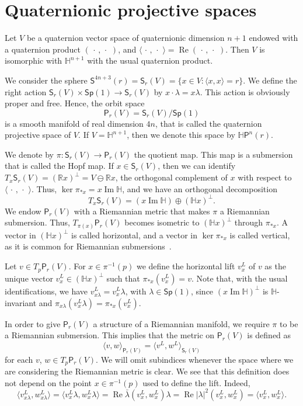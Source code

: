 \documentclass[12pt, a4paper]{amsart}
\newcommand{\R}{\mathbb{R}}
\renewcommand{\H}{\mathbb{H}}
\renewcommand{\Re}{\operatorname{Re}}
\renewcommand{\Im}{\operatorname{Im}}
\newcommand{\Sp}{\mathsf{Sp}}
\theoremstyle{remark}
\begin{document}
\section{Quaternionic projective spaces}

Let $V$ be a quaternion vector space of quaternionic dimension $n+1$ endowed with a quaternion product $(\,\cdot\,,\,\cdot\,\,)$, and $\langle\,\cdot\,,\,\cdot\,\,\rangle=\Re(\,\cdot\,,\,\cdot\,\,)$.
Then $V$ is isomorphic with $\H^{n+1}$ with the usual quaternion product.

We consider the sphere $\mathsf{S}^{4n+3}(r)=\mathsf{S}_r(V)=\{{x}\in V:\langle {x},{x}\rangle=r\}$.
We define the right action $\mathsf{S}_r(V)\times\Sp(1)\to\mathsf{S}_r(V)$ by ${x}\cdot \lambda={x}\lambda$.
This action is obviously proper and free. 
Hence, the orbit space 
\[
\mathsf{P}_r(V)=\mathsf{S}_r(V)/\Sp(1)
\]
is a smooth manifold of real dimension $4n$, that is called the quaternion projective space of $V$.
If $V=\H^{n+1}$, then we denote this space by $\H \mathsf{P}^n(r)$.

We denote by $\pi\colon\mathsf{S}_r(V)\to\mathsf{P}_r(V)$ the quotient map.
This map is a submersion that is called the Hopf map.
If ${x}\in\mathsf{S}_r(V)$, then we can identify $T_{x}\mathsf{S}_r(V)=(\R{x})^\perp=V\ominus\R{x}$, the orthogonal complement of ${x}$ with respect to $\langle\,\cdot\,,\,\cdot\,\,\rangle$.
Thus, $\ker\pi_{*{x}}={x}\Im\H$, and we have an orthogonal decomposition 
\[
T_{x}\mathsf{S}_r(V)=({x}\Im\H)\oplus(\H{x})^\perp.
\]
We endow $\mathsf{P}_r(V)$ with a Riemannian metric that makes $\pi$ a Riemannian submersion.
Thus, $T_{\pi({x})}\mathsf{P}_r(V)$ becomes isometric to $(\H{x})^\perp$ through $\pi_{*{x}}$.
A vector in $(\H x)^\perp$ is called horizontal, and a vector in $\ker\pi_{*x}$ is called vertical, as it is common for Riemannian submersions~\cite{ONeill}.

Let $v\in T_{p}\mathsf{P}_r(V)$.
For ${x}\in\pi^{-1}(p)$ we define the horizontal lift $v^L_{x}$ of $v$ as the unique vector $v_x^L\in(\H{x})^\perp$ such that $\pi_{*{x}}(v^L_{x})=v$.
Note that, with the usual identifications, we have $v_{x\lambda}^L=v_x^L\lambda$, with $\lambda\in\Sp(1)$, since $(x\Im\H)^\perp$ is $\H$-invariant and $\pi_{x\lambda}(v_x^L\lambda)=\pi_{*x}(v_x^L)$.
\medskip

In order to give $\mathsf{P}_r(V)$ a structure of a Riemannian manifold, we require $\pi$ to be a Riemannian submersion.
This implies that the metric on $\mathsf{P}_r(V)$ is defined as 
\[
\langle v,w\rangle_{\mathsf{P}_r(V)}=\langle v^L,w^L\rangle_{\mathsf{S}_r(V)}
\] 
for each $v$, $w\in T_p\mathsf{P}_r(V)$.
We will omit subindices whenever the space where we are considering the Riemannian metric is clear.
We see that this definition does not depend on the point ${x}\in\pi^{-1}(p)$ used to define the lift.
Indeed,
\[
\langle v^L_{{x}\lambda},w^L_{{x}\lambda}\rangle=
\langle v^L_{{x}}\lambda,w^L_{{x}}\lambda\rangle=
\Re\bar{\lambda}(v^L_{x},w^L_{x})\lambda=
\Re\lvert\lambda\rvert^2(v^L_{x},w^L_{x})=
\langle v^L_{x},w^L_{x}\rangle.
\]
\end{document}
